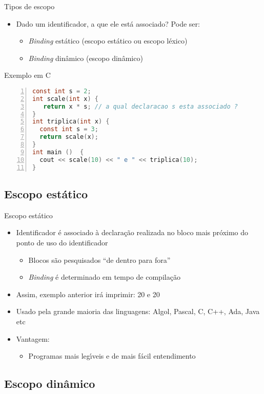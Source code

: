 \documentclass[handout,aspectratio=169]{beamer}
\newcommand{\bi}{\begin{itemize}[<+->]}
\newcommand{\ei}{\end{itemize}}
\begin{document}
\begin{frame}[fragile]{Tipos de escopo}

   \bi 
   \item Dado um identificador, a que ele est\'{a} associado? Pode ser:
      \bi 
      \item  \emph{Binding} est\'{a}tico (escopo est\'{a}tico ou escopo l\'{e}xico)
      \item  \emph{Binding} din\^{a}mico (escopo din\^{a}mico)
      \ei
	\ei
	
 \begin{block}{Exemplo em C}
 \tiny
	\begin{lstlisting}[language=C,numbers=left]
const int s = 2;
int scale(int x) { 
   return x * s; // a qual declaracao s esta associado ?
} 
int triplica(int x) {
  const int s = 3;
  return scale(x);
}
int main ()  { 
  cout << scale(10) << " e " << triplica(10); 
}
\end{lstlisting}
\end{block}	

\end{frame}


\subsection{Escopo est\'{a}tico}

\begin{frame}{Escopo est\'{a}tico}

   \bi 
   \item Identificador \'{e} associado à declara\c{c}\~{a}o realizada no bloco mais pr\'{o}ximo do ponto de uso do identificador
      \bi 
      \item Blocos s\~{a}o pesquisados ``de dentro para fora''
      \item  \emph{Binding} \'{e} determinado em tempo de compila\c{c}\~{a}o
      \ei
   \item Assim, exemplo anterior ir\'{a} imprimir: 20 e 20
   \item Usado pela grande maioria das linguagens: Algol, Pascal, C, C++, Ada, Java etc
   \item Vantagem:
      \bi 
      \item  Programas mais leg\'{\i}veis e de mais f\'{a}cil entendimento
      \ei
   \ei
\end{frame}

\subsection{Escopo din\^{a}mico}
\end{document}

